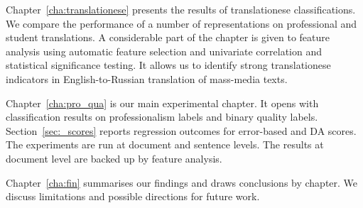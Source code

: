 Chapter~\ref{cha:translationese} presents the results of translationese classifications. We compare the performance of a number of representations on professional and student translations. A considerable part of the chapter is given to feature analysis using automatic feature selection and univariate correlation and statistical significance testing. It allows us to identify strong translationese indicators in English-to-Russian translation of mass-media texts.

Chapter~\ref{cha:pro_qua} is our main experimental chapter. It opens with classification results on professionalism labels and binary quality labels. Section~\ref{sec:_scores} reports regression outcomes for error-based and DA scores. The experiments are run at document and sentence levels. The results at document level are backed up by feature analysis. 

Chapter~\ref{cha:fin} summarises our findings and draws conclusions by chapter. We discuss limitations and possible directions for future work. 